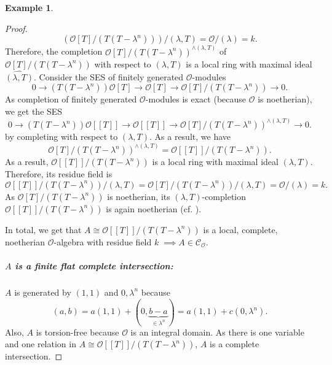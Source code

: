 \documentclass{article}
\theoremstyle{plain}%
\theoremstyle{definition}
\newtheorem{example}{Example}[section]
\theoremstyle{remark}
\newcommand{\co}{\mathcal{C}_\mathcal{O}}
\begin{document}
\begin{example}
\begin{proof}
        \[\left(\mathcal{O}[T]/(T(T-\lambda^n))\right)/(\lambda, T) = \mathcal{O}/(\lambda) = k.\]
        Therefore, the completion \(\mathcal{O}[T]/(T(T-\lambda^n))^{\wedge(\lambda, T)}\) 
        of \(\mathcal{O}[T]/(T(T-\lambda^n))\) with respect to \((\lambda, T)\) is a local ring with maximal ideal
        \(\widehat{(\lambda, T)}\).
        Consider the SES of finitely generated \(\mathcal{O}\)-modules
        \[
            0 \to (T(T - \lambda^n)) \mathcal{O}[T] \to \mathcal{O}[T] \to \mathcal{O}[T]/(T(T-\lambda^n)) \to 0.
        \]
        As completion of finitely generated \(\mathcal{O}\)-modules is exact (because \(\mathcal{O}\) is noetherian), we get the SES
        \[
            0 \to (T(T-\lambda^n))\mathcal{O}[[T]] \to \mathcal{O}[[T]] \to \mathcal{O}[T]/(T(T-\lambda^n))^{\wedge (\lambda, T)}  \to 0.
        \]
        by completing with respect to \((\lambda, T)\).
        As a result, we have
        \[
            \mathcal{O}[T]/(T(T-\lambda^n))^{\wedge (\lambda, T)} = \mathcal{O}[[T]]/(T(T-\lambda^n)).
        \]
        As a result, \(\mathcal{O}[[T]]/(T(T-\lambda^n))\) is a local ring with maximal ideal \((\lambda, T)\).
        Therefore, its residue field is
        \[
            \mathcal{O}[[T]]/(T(T-\lambda^n))/(\lambda, T) = \mathcal{O}[T]/(T(T-\lambda^n))/(\lambda, T) = \mathcal{O}/(\lambda) = k.
        \]
        As \(\mathcal{O}[T]/(T(T-\lambda^n))\) is noetherian, its \((\lambda, T)\)-completion \(\mathcal{O}[[T]]/(T(T-\lambda^n))\)
        is again noetherian (cf. \cite{Atiyah1969}).

        In total, we get that \(A \cong \mathcal{O}[[T]]/(T(T-\lambda^n))\) is a local, complete, noetherian \(\mathcal{O}\)-algebra 
        with residue field \(k\; \implies A \in \co\). 
        \subparagraph{\(A\) is a finite flat complete intersection:}
        \(A\) is generated by \((1,1)\) and \(0, \lambda^n\) because
        \[
            (a,b) = a(1,1) + (0, \underbrace{b-a}_{\in \lambda^n}) = a(1,1) + c(0, \lambda^n).
        \]
        Also, \(A\) is torsion-free because \(\mathcal{O}\) is an integral domain. 
        As there is one variable and one relation in \(A \cong \mathcal{O}[[T]]/(T(T-\lambda^n))\), \(A\) is a complete intersection.
    \end{proof}
\end{example}

\end{document}
